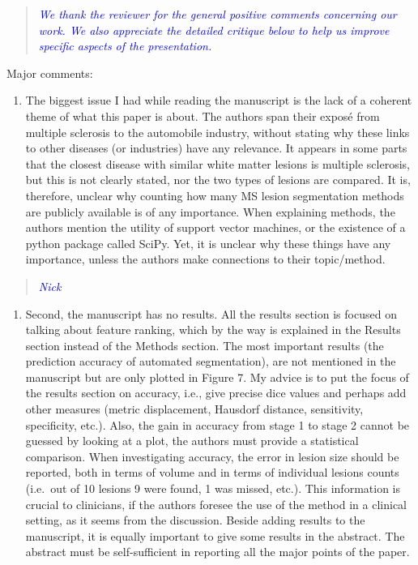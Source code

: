 \documentclass[12pt,]{article}
\providecommand{\tightlist}{%
  \setlength{\itemsep}{0pt}\setlength{\parskip}{0pt}}
\begin{document}
\begin{quote}
\emph{\textcolor{blue}{We thank the reviewer for the general positive comments concerning our work.  We also
appreciate the detailed critique below to help us improve specific aspects of the
presentation.}}
\end{quote}

Major comments:

\begin{enumerate}
\def\labelenumi{\arabic{enumi}.}
\tightlist
\item
  The biggest issue I had while reading the manuscript is the lack of a
  coherent theme of what this paper is about. The authors span their
  exposé from multiple sclerosis to the automobile industry, without
  stating why these links to other diseases (or industries) have any
  relevance. It appears in some parts that the closest disease with
  similar white matter lesions is multiple sclerosis, but this is not
  clearly stated, nor the two types of lesions are compared. It is,
  therefore, unclear why counting how many MS lesion segmentation
  methods are publicly available is of any importance. When explaining
  methods, the authors mention the utility of support vector machines,
  or the existence of a python package called SciPy. Yet, it is unclear
  why these things have any importance, unless the authors make
  connections to their topic/method.
\end{enumerate}

\begin{quote}
\emph{\textcolor{blue}{Nick}}
\end{quote}

\begin{enumerate}
\def\labelenumi{\arabic{enumi}.}
\setcounter{enumi}{1}
\tightlist
\item
  Second, the manuscript has no results. All the results section is
  focused on talking about feature ranking, which by the way is
  explained in the Results section instead of the Methods section. The
  most important results (the prediction accuracy of automated
  segmentation), are not mentioned in the manuscript but are only
  plotted in Figure 7. My advice is to put the focus of the results
  section on accuracy, i.e., give precise dice values and perhaps add
  other measures (metric displacement, Hausdorf distance, sensitivity,
  specificity, etc.). Also, the gain in accuracy from stage 1 to stage 2
  cannot be guessed by looking at a plot, the authors must provide a
  statistical comparison. When investigating accuracy, the error in
  lesion size should be reported, both in terms of volume and in terms
  of individual lesions counts (i.e.~out of 10 lesions 9 were found, 1
  was missed, etc.). This information is crucial to clinicians, if the
  authors foresee the use of the method in a clinical setting, as it
  seems from the discussion. Beside adding results to the manuscript, it
  is equally important to give some results in the abstract. The
  abstract must be self-sufficient in reporting all the major points of
  the paper.
\end{enumerate}
\end{document}
